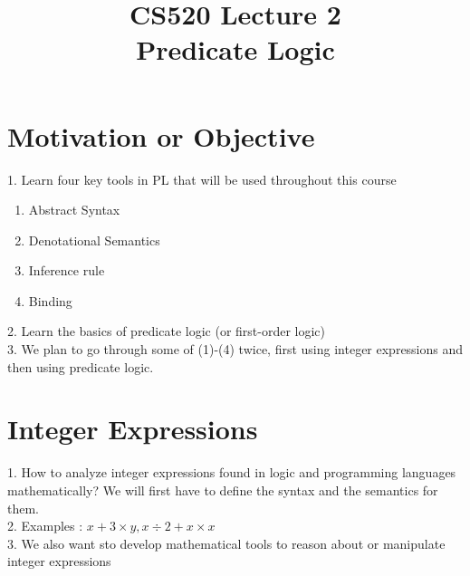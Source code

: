 \documentclass{report}[12pt]
\begin{document}
  {\topsep}{\topsep}%
  {\itshape}{}%
  {\bfseries}{}%
  {\newline}{}%

\theoremstyle{break}

\newtheorem{theorem}{Theorem}[section]
\newtheorem{definition}{Definition}
\newtheorem{proposition}{Proposition}
\newtheorem{corollary}{Corollary}
\newtheorem{lemma}{Lemma}
\newtheorem{example}{Example}
\newcommand{\nonterminal}[1]{\langle \text{#1}\rangle}
\newcommand{\rem}[0]{\text{ rem }}
\newcommand{\interp}[1]{\llbracket #1 \rrbracket}

\setcounter{chapter}{2}

\title{CS520 Lecture 2\\Predicate Logic}
\Large
\maketitle

\section{Motivation or Objective}
1. Learn four key tools in PL that will be used throughout this course \\
\begin{enumerate}
    \item Abstract Syntax
    \item Denotational Semantics
    \item Inference rule
    \item Binding
\end{enumerate}
2. Learn the basics of predicate logic (or first-order logic)\\
3. We plan to go through some of (1)-(4) twice, first using integer expressions and then using predicate logic.\\
\section{Integer Expressions}
1. How to analyze integer expressions found in logic and programming languages mathematically? We will first have to define the syntax and the semantics for them. \\
2. Examples : $x+3\times y, x\div 2 + x \times x$\\
3. We also want sto develop mathematical tools to reason about or manipulate integer expressions
\end{document}
